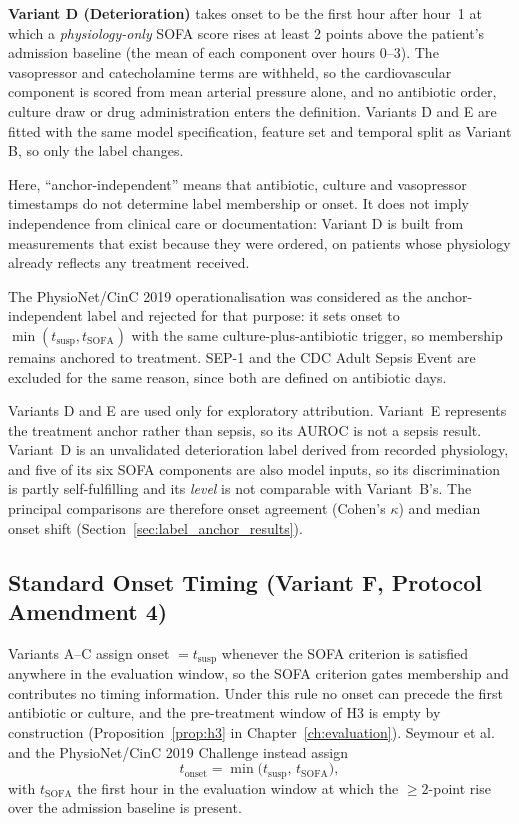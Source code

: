 \textbf{Variant D (Deterioration)} takes onset to be the first hour after hour~1
at which a \emph{physiology-only} SOFA score rises at least 2 points above the
patient's admission baseline (the mean of each component over hours 0--3). The
vasopressor and catecholamine terms are withheld, so the cardiovascular
component is scored from mean arterial pressure alone, and no antibiotic order,
culture draw or drug administration enters the definition. Variants D and E are
fitted with the same model specification, feature set and temporal split as
Variant B, so only the label changes.

Here, ``anchor-independent'' means that antibiotic, culture and vasopressor
timestamps do not determine label membership or onset. It does not imply
independence from clinical care or documentation: Variant D is built from
measurements that exist because they were ordered, on patients whose
physiology already reflects any treatment received.

The PhysioNet/CinC 2019 operationalisation \cite{reyna2020utility} was
considered as the anchor-independent label and rejected for that purpose: it
sets onset to $\min(t_{\text{susp}}, t_{\text{SOFA}})$ with the same
culture-plus-antibiotic trigger, so membership remains anchored to treatment.
SEP-1 and the CDC Adult Sepsis Event \cite{dutta2026performance} are excluded
for the same reason, since both are defined on antibiotic days.

Variants D and E are used only for exploratory attribution. Variant~E
represents the treatment anchor rather than sepsis, so its AUROC is not a
sepsis result. Variant~D is an unvalidated deterioration label derived from
recorded physiology, and five of its six SOFA components are also model
inputs, so its discrimination is partly self-fulfilling and its \emph{level}
is not comparable with Variant~B's. The principal comparisons are therefore
onset agreement (Cohen's $\kappa$) and median onset shift
(Section~\ref{sec:label_anchor_results}).

\subsection{Standard Onset Timing (Variant F, Protocol Amendment 4)}
\label{sec:variant_f}

Variants A--C assign onset $= t_{\text{susp}}$ whenever the SOFA criterion is
satisfied anywhere in the evaluation window, so the SOFA criterion gates
membership and contributes no timing information. Under this rule no onset can
precede the first antibiotic or culture, and the pre-treatment window of H3 is
empty by construction (Proposition~\ref{prop:h3} in
Chapter~\ref{ch:evaluation}). Seymour et al.\ \cite{seymour2016assessment} and
the PhysioNet/CinC 2019 Challenge \cite{reyna2020utility} instead assign
\begin{equation}
    t_{\text{onset}} = \min\bigl(t_{\text{susp}},\, t_{\text{SOFA}}\bigr),
    \label{eq:early_onset}
\end{equation}
with $t_{\text{SOFA}}$ the first hour in the evaluation window at which the
$\geq 2$-point rise over the admission baseline is present.

